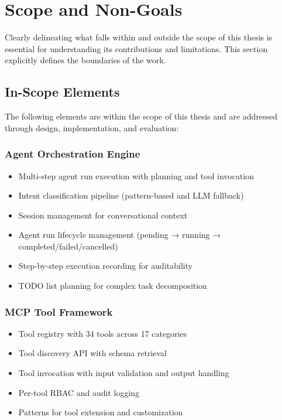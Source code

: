 
\section{Scope and Non-Goals}
\label{sec:scope-nongoals}

Clearly delineating what falls within and outside the scope of this thesis is essential for understanding its contributions and limitations. This section explicitly defines the boundaries of the work.

\subsection{In-Scope Elements}

The following elements are within the scope of this thesis and are addressed through design, implementation, and evaluation:

\subsubsection{Agent Orchestration Engine}

\begin{itemize}
    \item Multi-step agent run execution with planning and tool invocation
    \item Intent classification pipeline (pattern-based and LLM fallback)
    \item Session management for conversational context
    \item Agent run lifecycle management (pending → running → completed/failed/cancelled)
    \item Step-by-step execution recording for auditability
    \item TODO list planning for complex task decomposition
\end{itemize}

\subsubsection{MCP Tool Framework}

\begin{itemize}
    \item Tool registry with 34 tools across 17 categories
    \item Tool discovery API with schema retrieval
    \item Tool invocation with input validation and output handling
    \item Per-tool RBAC and audit logging
    \item Patterns for tool extension and customization
\end{itemize}

